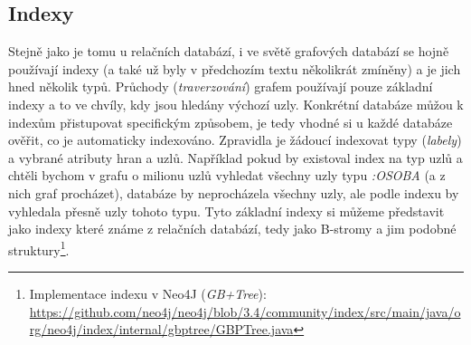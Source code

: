 \subsection{Indexy}
\label{sec:gdb-indexy}
Stejně jako je tomu u relačních databází, i ve světě grafových databází se hojně používají indexy (a také už byly v předchozím textu několikrát zmíněny) a je jich hned několik typů. Průchody (\textit{traverzování}) grafem používají pouze základní indexy a to ve chvíly, kdy jsou hledány výchozí uzly. Konkrétní databáze můžou k indexům přistupovat specifickým způsobem, je tedy vhodné si u každé databáze ověřit, co je automaticky indexováno. Zpravidla je žádoucí indexovat typy (\textit{labely}) a vybrané atributy hran a uzlů. Například pokud by existoval index na typ uzlů a chtěli bychom v grafu o milionu uzlů vyhledat všechny uzly typu \textit{:OSOBA} (a z nich graf procházet), databáze by neprocházela všechny uzly, ale podle indexu by vyhledala přesně uzly tohoto typu. Tyto základní indexy si můžeme představit jako indexy které známe z relačních databází, tedy jako B-stromy a jim podobné struktury\footnote{Implementace indexu v Neo4J (\textit{GB+Tree}): \url{https://github.com/neo4j/neo4j/blob/3.4/community/index/src/main/java/org/neo4j/index/internal/gbptree/GBPTree.java}}.

